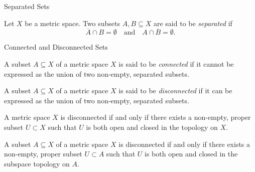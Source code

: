 \documentclass[12pt, a4paper]{article}
\begin{document}
\FrontPage
\Large

\begin{heading}
    Separated Sets
\end{heading}

\vspace{10pt}

\begin{definition}
    Let \(X\) be a metric space. Two subsets \(A, B \subseteq X\) are said to be \textit{separated} if
    \[
        \overline{A} \cap B = \emptyset \quad \text{and} \quad A \cap \overline{B} = \emptyset.
    \]
\end{definition}

\clearpage

\begin{heading}
    Connected and Disconnected Sets
\end{heading}

\vspace{10pt}

\begin{definition}
    A subset \(A \subseteq X\) of a metric space \(X\) is said to be \textit{connected} if it cannot be expressed as the union of two non-empty, separated subsets.
\end{definition}

\vspace{200pt}

\begin{definition}
    A subset \(A \subseteq X\) of a metric space \(X\) is said to be \textit{disconnected} if it can be expressed as the union of two non-empty, separated subsets.
\end{definition}

\clearpage

\begin{theorem}
    A metric space \(X\) is disconnected if and only if there exists a non-empty, proper subset \(U \subset X\) such that \(U\) is both open and closed in the topology on \(X\).
\end{theorem}

\clearpage

\begin{theorem}
    A subset \(A \subseteq X\) of a metric space \(X\) is disconnected if and only if there exists a non-empty, proper subset \(U \subset A\) such that \(U\) is both open and closed in the subspace topology on \(A\).
\end{theorem}
\end{document}
